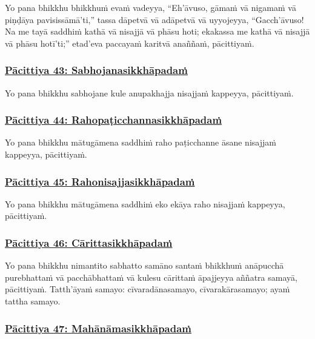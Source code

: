 Yo pana bhikkhu bhikkhuṁ evaṁ vadeyya, ``Eh'āvuso, gāmaṁ vā nigamaṁ vā piṇḍāya pavisissāmā'ti,'' tassa dāpetvā vā adāpetvā vā uyyojeyya, ``Gacch'āvuso! Na me tayā saddhiṁ kathā vā nisajjā vā phāsu hoti; ekakassa me kathā vā nisajjā vā phāsu hotī'ti;'' etad'eva paccayaṁ karitvā anaññaṁ, pācittiyaṁ.



\subsubsection*{\hyperref[exp43]{Pācittiya 43: Sabhojanasikkhāpadaṁ}}
\label{pac43}

Yo pana bhikkhu sabhojane kule anupakhajja nisajjaṁ kappeyya, pācittiyaṁ.



\subsubsection*{\hyperref[exp44]{Pācittiya 44: Rahopaṭicchannasikkhāpadaṁ}}
\label{pac44}

Yo pana bhikkhu mātugāmena saddhiṁ raho paṭicchanne āsane nisajjaṁ kappeyya, pācittiyaṁ.



\subsubsection*{\hyperref[exp45]{Pācittiya 45: Rahonisajjasikkhāpadaṁ}}
\label{pac45}

Yo pana bhikkhu mātugāmena saddhiṁ eko ekāya raho nisajjaṁ kappeyya, pācittiyaṁ.



\subsubsection*{\hyperref[exp46]{Pācittiya 46: Cārittasikkhāpadaṁ}}
\label{pac46}

Yo pana bhikkhu nimantito sabhatto samāno santaṁ bhikkhuṁ anāpucchā purebhattaṁ vā pacchābhattaṁ vā kulesu cārittaṁ āpajjeyya aññatra samayā, pācittiyaṁ. Tatth'āyaṁ samayo: cīvaradānasamayo, cīvarakārasamayo; ayaṁ tattha samayo.



\subsubsection*{\hyperref[exp47]{Pācittiya 47: Mahānāmasikkhāpadaṁ}}
\label{pac47}

